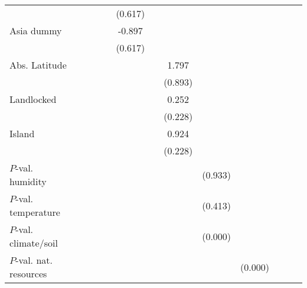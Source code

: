 \begin{sidewaystable}[h!]
\begin{threeparttable}
\begin{center}
\begin{minipage}{\textwidth}
\begin{tabular*}{\textwidth}{@{\extracolsep{\fill}}lcccccccccccc@{\extracolsep{\fill}}}
            &                     &                     &                     &                     &     (0.617)         &                     &                     &                     &                     \\
[0.125em]
Asia dummy        &                     &                     &                     &                     &      -0.897         &                     &                     &                     &                     \\
            &                     &                     &                     &                     &     (0.617)         &                     &                     &                     &                     \\
[0.125em]
Abs. Latitude    &                     &                     &                     &                     &                     &                     &       1.797\sym{**} &                     &                     \\
            &                     &                     &                     &                     &                     &                     &     (0.893)         &                     &                     \\
[0.125em]
Landlocked    &                     &                     &                     &                     &                     &                     &       0.252         &                     &                     \\
            &                     &                     &                     &                     &                     &                     &     (0.228)         &                     &                     \\
[0.125em]
Island    &                     &                     &                     &                     &                     &                     &       0.924\sym{***}&                     &                     \\
            &                     &                     &                     &                     &                     &                     &     (0.228)         &                     &                     \\
[0.25em]
$P$-val. humidity &&&&&&&& (0.933) & \\
$P$-val. temperature &&&&&&&& (0.413) & \\
$P$-val. climate/soil &&&&&&&& (0.000) & \\
$P$-val. nat. resources &&&&&&&&   & (0.000)\\

\end{tabular*}
\end{minipage}
\end{center}
\end{threeparttable}
\end{sidewaystable}
